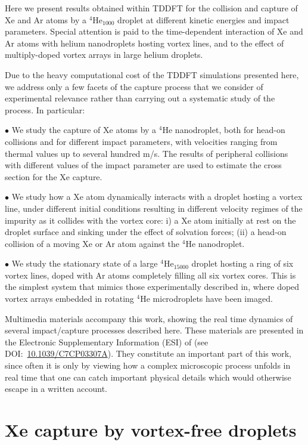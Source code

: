 Here we present results obtained within TDDFT 
for the collision and capture of Xe and Ar atoms by a $^4$He$_{1000}$ 
droplet at different kinetic energies and impact parameters. Special attention is paid 
to the  time-dependent interaction of Xe and Ar atoms with 
helium nanodroplets hosting 
vortex lines, and to the effect of multiply-doped vortex arrays in large helium droplets.

Due to the heavy computational cost 
of the TDDFT simulations presented here, 
we  address only a few facets of the capture 
process that we consider of experimental relevance
rather than carrying out a systematic study of the process. In particular:

$\bullet$ We study the capture of Xe atoms by a $^4$He nanodroplet, both for head-on 
collisions and for different impact parameters,
with velocities ranging from thermal values up to several hundred m/s.
The results of peripheral collisions  
with different values of the impact parameter 
are used to estimate the cross section for the
Xe capture.
 
$\bullet$ We study how a Xe atom dynamically interacts with a 
droplet hosting a vortex line, under different initial conditions
resulting in different velocity regimes of the impurity as it 
collides with the vortex core:
i) a Xe atom initially at rest on the droplet surface and
sinking under the effect of solvation forces;
(ii) a head-on collision of a moving Xe or Ar atom  against the
$^4$He nanodroplet.

$\bullet$ We study the stationary state of 
a large $^4$He$_{15000}$ 
droplet hosting a ring of six vortex lines, doped with 
Ar atoms completely filling all six vortex cores. This is the simplest system that mimics those
experimentally described in, where 
doped vortex arrays embedded in rotating $^4$He microdroplets have been imaged.

Multimedia materials accompany this work, 
showing the real time dynamics of several impact/capture processes 
described here. These materials  are presented 
in the Electronic Supplementary Information (ESI) of (see DOI:~\href{http://dx.doi.org/10.1039/C7CP03307A}{10.1039/C7CP03307A}).
They constitute  an important part of this work, 
since often it is only by viewing how a complex microscopic process
unfolds in real time that one can catch important physical details 
which would otherwise escape in a written account.

\section{Xe capture by vortex-free droplets}

